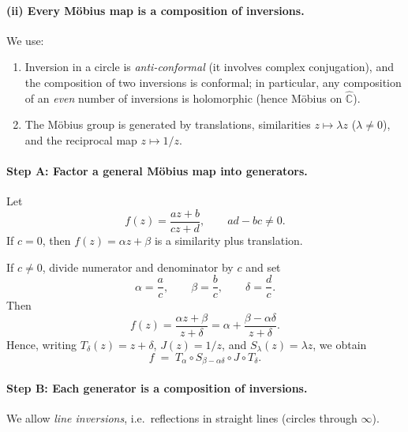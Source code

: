 \documentclass[12pt,a4paper]{article}
\theoremstyle{plain}
\theoremstyle{definition}      %
\begin{document}
\paragraph{\textbf{(ii) Every Möbius map is a composition of inversions.}}
We use:
\begin{enumerate}
	\item Inversion in a circle is \emph{anti-conformal} (it involves complex conjugation), and the composition of two inversions is conformal; in particular, any composition of an \emph{even} number of inversions is holomorphic (hence Möbius on $\widehat{\mathbb C}$).
	\item The Möbius group is generated by translations, similarities $z\mapsto \lambda z$ ($\lambda\neq 0$), and the reciprocal map $z\mapsto 1/z$.
\end{enumerate}

\paragraph{\textbf{Step A: Factor a general Möbius map into generators.}}
Let
\[
f(z)=\frac{az+b}{cz+d},\qquad ad-bc\neq 0.
\]
If $c=0$, then $f(z)=\alpha z+\beta$ is a similarity plus translation.

If $c\neq 0$, divide numerator and denominator by $c$ and set
\[
\alpha=\frac ac,\qquad \beta=\frac bc,\qquad \delta=\frac dc.
\]
Then
\[
f(z)=\frac{\alpha z+\beta}{z+\delta}
=\alpha+\frac{\beta-\alpha\delta}{z+\delta}.
\]
Hence, writing $T_\delta(z)=z+\delta$, $J(z)=1/z$, and $S_\lambda(z)=\lambda z$, we obtain
\[
f \;=\; T_\alpha \circ S_{\beta-\alpha\delta}\circ J \circ T_\delta.
\]

\paragraph{\textbf{Step B: Each generator is a composition of inversions.}}
We allow \emph{line inversions}, i.e.\ reflections in straight lines (circles through $\infty$).
\end{document}
